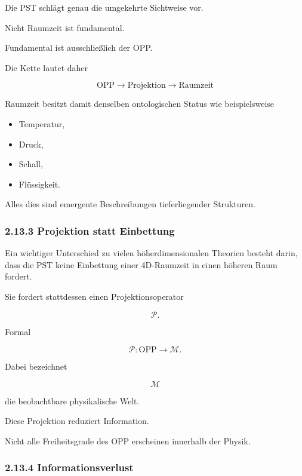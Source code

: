 Die PST schlägt genau die umgekehrte Sichtweise vor.

Nicht Raumzeit ist fundamental.

Fundamental ist ausschließlich der OPP.

Die Kette lautet daher

\[
\boxed{
\text{OPP}
\longrightarrow
\text{Projektion}
\longrightarrow
\text{Raumzeit}
}
\]

Raumzeit besitzt damit denselben ontologischen Status wie beispielsweise

\begin{itemize}
\item Temperatur,
\item Druck,
\item Schall,
\item Flüssigkeit.
\end{itemize}

Alles dies sind emergente Beschreibungen tieferliegender Strukturen.


\subsubsection*{2.13.3 Projektion statt Einbettung}

Ein wichtiger Unterschied zu vielen höherdimensionalen Theorien besteht darin,
dass die PST keine Einbettung einer 4D-Raumzeit in einen höheren Raum fordert.

Sie fordert stattdessen einen Projektionsoperator

\[
\mathcal P.
\]

Formal

\[
\mathcal P :
\mathrm{OPP}
\rightarrow
\mathcal M.
\]

Dabei bezeichnet

\[
\mathcal M
\]

die beobachtbare physikalische Welt.

Diese Projektion reduziert Information.

Nicht alle Freiheitsgrade des OPP erscheinen innerhalb der Physik.


\subsubsection*{2.13.4 Informationsverlust}


